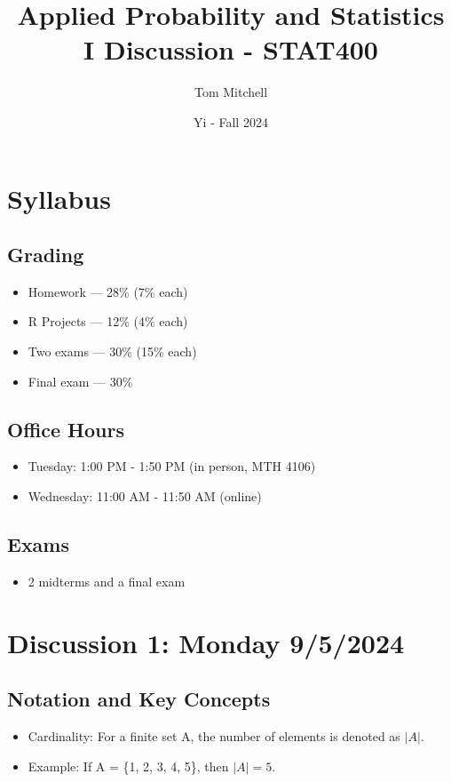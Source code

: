 \documentclass{article}
\title{Applied Probability and Statistics I Discussion - STAT400}
\author{Tom Mitchell}
\date{Yi - Fall 2024}
\begin{document}
\maketitle

\section*{Syllabus}

\subsection*{Grading}
\begin{itemize}
    \item Homework — 28\% (7\% each)
    \item R Projects — 12\% (4\% each)
    \item Two exams — 30\% (15\% each)
    \item Final exam — 30\%
\end{itemize}

\subsection*{Office Hours}
\begin{itemize}
    \item Tuesday: 1:00 PM - 1:50 PM (in person, MTH 4106)
    \item Wednesday: 11:00 AM - 11:50 AM (online)
\end{itemize}

\subsection*{Exams}
\begin{itemize}
    \item 2 midterms and a final exam
\end{itemize}

\section*{Discussion 1: Monday 9/5/2024}

\subsection*{Notation and Key Concepts}

\begin{itemize}
    \item Cardinality: For a finite set A, the number of elements is denoted as $|A|$.
    \item Example: If A = \{1, 2, 3, 4, 5\}, then $|A| = 5$.
\end{itemize}
\end{document}
